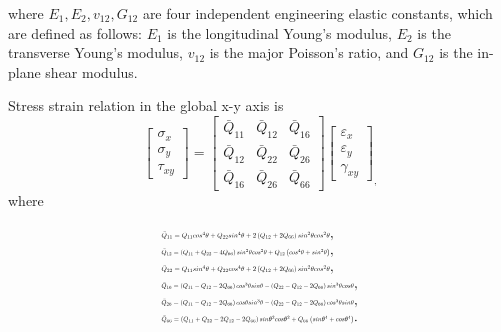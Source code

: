 where $E_1, E_2, v_{12}, G_{12} $ are four independent engineering elastic constants, which are defined as follows: $E_1 $ is the longitudinal Young's modulus, $E_2 $ is the transverse Young's modulus, $v_{12} $ is the major Poisson's ratio, and $G_{12} $ is the in-plane shear modulus.

Stress strain relation in the global x-y axis is
\begin{equation}\left[\begin{array}{l}\sigma _{x} \\ \sigma _{y} \\
	\tau_{xy}\end{array}\right]=\left[\begin{array}{lll}\bar{Q}_{11} &
\bar{Q}_{12} & \bar{Q}_{16}\\ \bar{Q}_{12} & \bar{Q}_{22} & \bar{Q}_{26} \\
\bar{Q}_{16} & \bar{Q}_{26}
			 &\bar{Q}_{66}\end{array}\right]\left[\begin{array}{l}\varepsilon_{x}
	 \\ \varepsilon_{y}\\ \gamma_{x y}\end{array}\right]_{\textstyle ,}
\end{equation}
where

\begin{equation}
	\begin{array}{l}
		\resizebox{.35\textwidth}{!}{$\bar{Q}_{11}=Q_{11} cos^{4}\theta+Q_{22} sin^{4}\theta+2\left(Q_{12}+2
		Q_{66}\right) sin^{2}\theta cos^{2}\theta$}, \\

		\resizebox{.35\textwidth}{!}{$\bar{Q}_{12}=\left(Q_{11}+Q_{22}-4 Q_{66}\right) sin^{2}\theta
		cos^{2}\theta+Q_{12}\left(cos^{4}\theta+sin^{2}\theta \right)$}, \\

		\resizebox{.35\textwidth}{!}{$\bar{Q}_{22}=Q_{11} sin^{4}\theta+Q_{22} cos^{4}\theta+2\left(Q_{12}+2
		Q_{66}\right) sin^{2}\theta cos^{2}\theta$}, \\

		\resizebox{.4\textwidth}{!}{$\bar{Q}_{16}=\left(Q_{11}-Q_{12}-2
		Q_{66}\right) cos^{3}\theta sin\theta-\left(Q_{22}-Q_{12}-2Q_{66}\right)
	sin^{3}\theta cos\theta$}, \\ 
		\resizebox{.4\textwidth}{!}{$\bar{Q}_{26}=\left(Q_{11}-Q_{12}-2
		Q_{66}\right) cos\theta sin^{3}\theta-\left(Q_{22}-Q_{12}-2
Q_{66}\right)cos^{3}\theta sin\theta$},
		 \\ 
	\resizebox{.4\textwidth}{!}	{$\bar{Q}_{66}=\left(Q_{11}+Q_{22}-2 Q_{12}-2 Q_{66}\right)
	sin\theta^{2}cos\theta^{2}+Q_{66}\left(sin\theta^{4}+cos\theta^{4}\right)$}.\\
	\end{array}
\end{equation}


